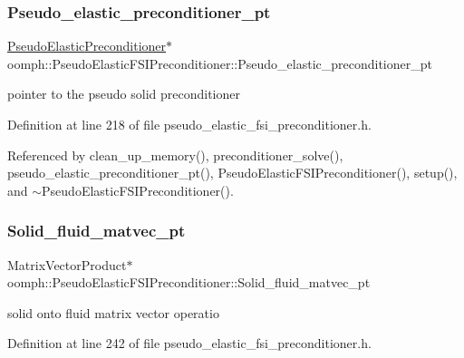 \subsubsection{\texorpdfstring{Pseudo\+\_\+elastic\+\_\+preconditioner\+\_\+pt}{Pseudo\_elastic\_preconditioner\_pt}}
{\footnotesize\ttfamily \hyperlink{classoomph_1_1PseudoElasticPreconditioner}{Pseudo\+Elastic\+Preconditioner}$\ast$ oomph\+::\+Pseudo\+Elastic\+F\+S\+I\+Preconditioner\+::\+Pseudo\+\_\+elastic\+\_\+preconditioner\+\_\+pt\hspace{0.3cm}{\ttfamily [private]}}



pointer to the pseudo solid preconditioner 



Definition at line 218 of file pseudo\+\_\+elastic\+\_\+fsi\+\_\+preconditioner.\+h.



Referenced by clean\+\_\+up\+\_\+memory(), preconditioner\+\_\+solve(), pseudo\+\_\+elastic\+\_\+preconditioner\+\_\+pt(), Pseudo\+Elastic\+F\+S\+I\+Preconditioner(), setup(), and $\sim$\+Pseudo\+Elastic\+F\+S\+I\+Preconditioner().

\mbox{\label{classoomph_1_1PseudoElasticFSIPreconditioner_a8699afc5b64ec0c3db5c3cea5fd60c18}} 
\subsubsection{\texorpdfstring{Solid\+\_\+fluid\+\_\+matvec\+\_\+pt}{Solid\_fluid\_matvec\_pt}}
{\footnotesize\ttfamily Matrix\+Vector\+Product$\ast$ oomph\+::\+Pseudo\+Elastic\+F\+S\+I\+Preconditioner\+::\+Solid\+\_\+fluid\+\_\+matvec\+\_\+pt\hspace{0.3cm}{\ttfamily [private]}}



solid onto fluid matrix vector operatio 



Definition at line 242 of file pseudo\+\_\+elastic\+\_\+fsi\+\_\+preconditioner.\+h.



